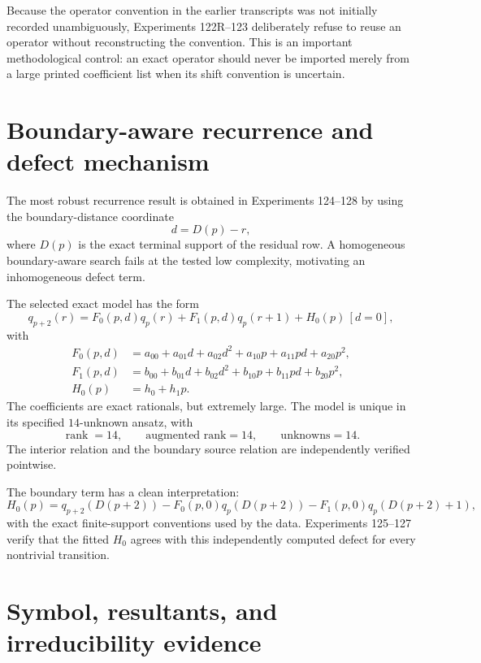 \documentclass[11pt,a4paper]{article}
\newcommand{\rank}{\operatorname{rank}}
\begin{document}
Because the operator convention in the earlier transcripts was not initially recorded unambiguously, Experiments 122R--123 deliberately refuse to reuse an operator without reconstructing the convention.  This is an important methodological control: an exact operator should never be imported merely from a large printed coefficient list when its shift convention is uncertain.

\section{Boundary-aware recurrence and defect mechanism}

The most robust recurrence result is obtained in Experiments 124--128 by using the boundary-distance coordinate
\[
d=D(p)-r,
\]
where $D(p)$ is the exact terminal support of the residual row.  A homogeneous boundary-aware search fails at the tested low complexity, motivating an inhomogeneous defect term.

The selected exact model has the form
\begin{equation}
\label{eq:defect}
q_{p+2}(r)
=
F_0(p,d)q_p(r)
+F_1(p,d)q_p(r+1)
+H_0(p)\,[d=0],
\end{equation}
with
\begin{align*}
F_0(p,d)&=a_{00}+a_{01}d+a_{02}d^2+a_{10}p+a_{11}pd+a_{20}p^2,\\
F_1(p,d)&=b_{00}+b_{01}d+b_{02}d^2+b_{10}p+b_{11}pd+b_{20}p^2,\\
H_0(p)&=h_0+h_1p.
\end{align*}
The coefficients are exact rationals, but extremely large.  The model is unique in its specified $14$-unknown ansatz, with
\[
\rank=14,\qquad
\text{augmented rank}=14,
\qquad
\text{unknowns}=14.
\]
The interior relation and the boundary source relation are independently verified pointwise.

The boundary term has a clean interpretation:
\begin{equation}
H_0(p)=q_{p+2}(D(p+2))
-
F_0(p,0)q_p(D(p+2))
-
F_1(p,0)q_p(D(p+2)+1),
\end{equation}
with the exact finite-support conventions used by the data.  Experiments 125--127 verify that the fitted $H_0$ agrees with this independently computed defect for every nontrivial transition.

\section{Symbol, resultants, and irreducibility evidence}
\end{document}
